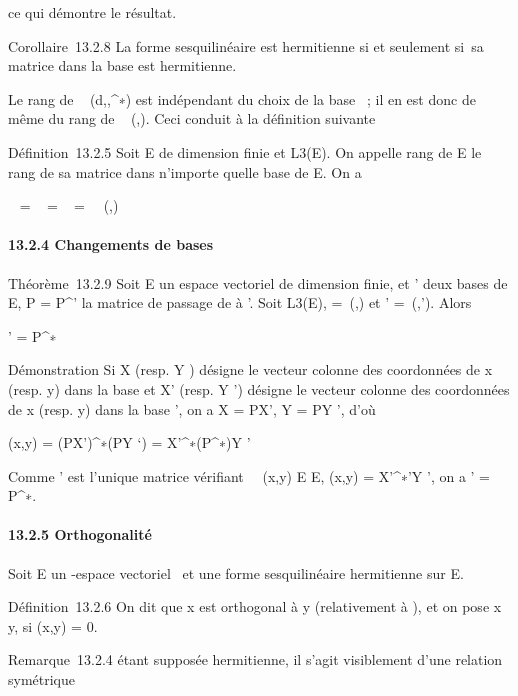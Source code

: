 ce qui démontre le résultat.

Corollaire~13.2.8 La forme sesquilinéaire \phi est hermitienne si et
seulement si~sa matrice dans la base  est hermitienne.

Le rang de \mathrmMat~
(d\phi,,^∗) est indépendant du choix de la base ~;
il en est donc de même du rang de
\mathrmMat~ (\phi,). Ceci
conduit à la définition suivante

Définition~13.2.5 Soit E de dimension finie et \phi \in L3(E). On
appelle rang de E le rang de sa matrice dans n'importe quelle base de E.
On a

\mathrmrg~\phi
= \mathrmrgd\phi~
= \mathrmrgg\phi~
=\
\mathrmrg\mathrmMat~
(\phi,)

\paragraph{13.2.4 Changements de bases}

Théorème~13.2.9 Soit E un espace vectoriel de dimension finie,  et '
deux bases de E, P = P\mathcal{E}^\mathcal{E}' la matrice de passage de  à
\mathcal{E}'. Soit \phi \in L3\diagup2(E), \Omega =\
\mathrmMat (\phi,) et \Omega' =\
\mathrmMat (\phi,\mathcal{E}'). Alors

\Omega' = P^∗\OmegaP

Démonstration Si X (resp. Y ) désigne le vecteur colonne des coordonnées
de x (resp. y) dans la base  et X' (resp. Y ') désigne le vecteur
colonne des coordonnées de x (resp. y) dans la base ', on a X = PX', Y
= PY ', d'où

\phi(x,y) = (PX')^∗\Omega(PY `) = X'^∗(P^∗\OmegaP)Y
'

Comme \Omega' est l'unique matrice vérifiant \forall~~(x,y)
\in E \times E, \phi(x,y) = X'^∗\Omega'Y ', on a \Omega' = P^∗\OmegaP.

\paragraph{13.2.5 Orthogonalité}

Soit E un -espace vectoriel ~et \phi une forme sesquilinéaire hermitienne
sur E.

Définition~13.2.6 On dit que x est orthogonal à y (relativement à \phi), et
on pose x \bot y, si \phi(x,y) = 0.

Remarque~13.2.4 \phi étant supposée hermitienne, il s'agit visiblement
d'une relation symétrique

